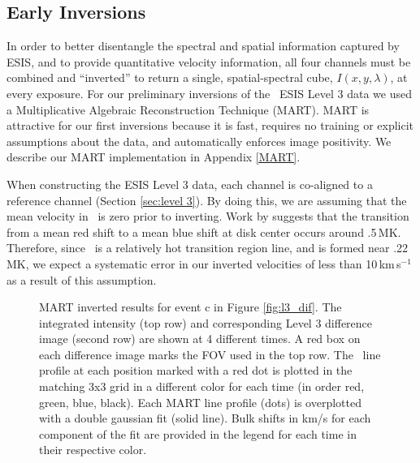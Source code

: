     
    
    \subsection{Early Inversions} \label{sec:inversions}
    	In order to better disentangle the spectral and spatial information captured by ESIS, and to provide quantitative velocity information, all four channels must be combined and ``inverted'' to return a single, spatial-spectral cube, $I(x,y,\lambda)$, at every exposure.
    	For our preliminary inversions of the \ov \  ESIS Level 3 data we used a Multiplicative Algebraic Reconstruction Technique (MART).
    	MART is attractive for our first inversions because it is fast, requires no training or explicit assumptions about the data, and automatically enforces image  positivity.
    	We describe our MART implementation in Appendix \ref{MART}.
    	
    	When constructing the ESIS Level 3 data, each channel is co-aligned to a reference channel (Section \ref{sec:level 3}).
    	By doing this, we are assuming that the mean velocity in \ov \ is zero prior to inverting.
    	Work by \citet{Peter1999} suggests that the transition from a mean red shift to a mean blue shift at disk center occurs around .5\,MK.
    	Therefore, since \ov \ is a relatively hot transition region line, and is formed near .22\,MK, we expect a systematic error in our inverted velocities of less than 10\,km\,s$^{-1}$ as a result of this assumption.
    	 
    	
    	\begin{figure}[htb!]
    		\centering
    		\caption{MART inverted results for event c in Figure \ref{fig:l3_dif}. The integrated intensity (top row) and corresponding Level 3 difference image (second row) are shown at 4 different times. A red box on each difference image marks the FOV used in the top row.  The \ov \ line profile at each position marked with a red dot is plotted in the matching 3x3 grid in a different color for each time (in order red, green, blue, black). Each MART line profile (dots) is overplotted with a double gaussian fit (solid line).  Bulk shifts in km/s for each component of the fit are provided in the legend for each time in their respective color. }
    		\label{fig:perfect_x_inverted}
    	\end{figure}
        
